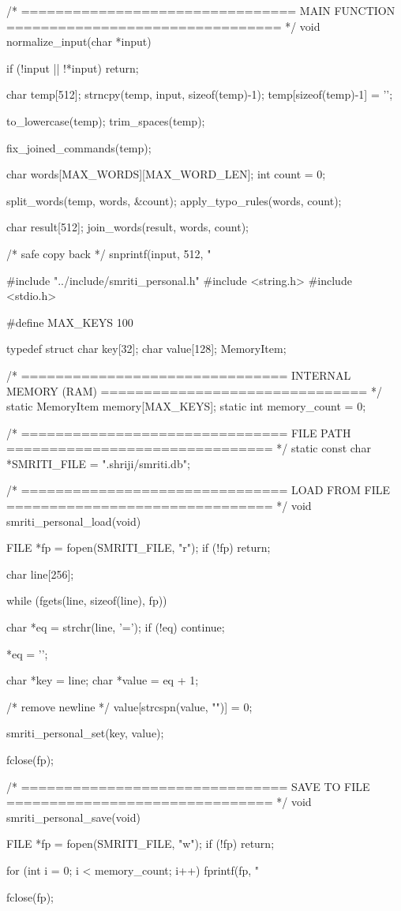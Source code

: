\documentclass{article}
\begin{document}
/* ================================
   MAIN FUNCTION
================================ */
void normalize_input(char *input)
{

    if (!input || !*input)
        return;

    char temp[512];
    strncpy(temp, input, sizeof(temp)-1);
    temp[sizeof(temp)-1] = '\0';

    to_lowercase(temp);
    trim_spaces(temp);

    fix_joined_commands(temp);

    char words[MAX_WORDS][MAX_WORD_LEN];
    int count = 0;

    split_words(temp, words, &count);
    apply_typo_rules(words, count);

char result[512];
join_words(result, words, count);

/* safe copy back */
snprintf(input, 512, "%
}
#include "../include/smriti_personal.h"
#include <string.h>
#include <stdio.h>

#define MAX_KEYS 100

typedef struct {
    char key[32];
    char value[128];
} MemoryItem;

/* ===============================
   INTERNAL MEMORY (RAM)
   =============================== */
static MemoryItem memory[MAX_KEYS];
static int memory_count = 0;

/* ===============================
   FILE PATH
   =============================== */
static const char *SMRITI_FILE = ".shriji/smriti.db";

/* ===============================
   LOAD FROM FILE
   =============================== */
void smriti_personal_load(void)
{
    FILE *fp = fopen(SMRITI_FILE, "r");
    if (!fp) return;

    char line[256];

    while (fgets(line, sizeof(line), fp))
    {
        char *eq = strchr(line, '=');
        if (!eq) continue;

        *eq = '\0';

        char *key = line;
        char *value = eq + 1;

        /* remove newline */
        value[strcspn(value, "\n")] = 0;

        smriti_personal_set(key, value);
    }

    fclose(fp);
}

/* ===============================
   SAVE TO FILE
   =============================== */
void smriti_personal_save(void)
{
    FILE *fp = fopen(SMRITI_FILE, "w");
    if (!fp) return;

    for (int i = 0; i < memory_count; i++)
    {
        fprintf(fp, "%
    }

    fclose(fp);
}
\end{document}
